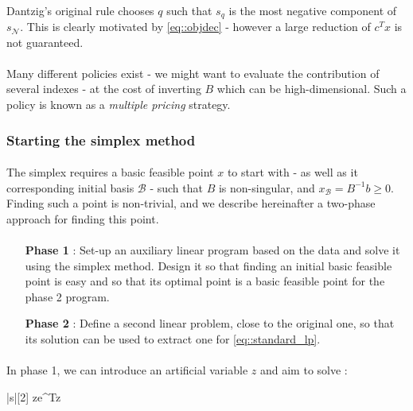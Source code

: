\documentclass[a4paper]{article}
\newcommand\reflp{\eqref{eq::standard_lp}}
\begin{document}
{{{				
				\paragraph{} Dantzig's original rule chooses $q$ such that $s_q$ is the most negative component of $s_\mathcal{N}$. This is clearly motivated by \eqref{eq::objdec} - however a large reduction of $c^Tx$ is not guaranteed. 
				
				\paragraph{} Many different policies exist - we might want to evaluate the contribution of  several indexes - at the cost of inverting $B$ which can be high-dimensional. Such a policy is known as a \emph{multiple pricing} strategy. 
			}
			\subsubsection{Starting the simplex method}
			{
				\paragraph{} The simplex requires a basic feasible point $x$ to start with - as well as it corresponding initial basis $\mathcal{B}$ - such that $B$ is non-singular, and $x_\mathcal{B} = B^{-1}b\geq 0$. Finding such a point is non-trivial, and we describe hereinafter a two-phase approach for finding this point. 
				
				\paragraph{} 
				\sffamily
				{
				\begin{itemize}
					\item[\textbf{Phase 1}] : Set-up an auxiliary linear program based on the data and solve it using the simplex method. Design it so that finding an initial basic feasible point is easy and so that its optimal point is a basic feasible point for the phase 2 program. 
					\item[\textbf{Phase 2}] : Define a second linear problem, close to the original one, so that its solution can be used to extract one for \reflp. 
				\end{itemize}	
				
				\rmfamily
				\paragraph{} In phase 1, we can introduce an artificial variable $z$ and aim to solve : 
				\begin{mini}|s|[2]
					{z}{e^Tz}
					{\label{eq::firstphase}}{}
				\end{mini}
				
}}}}
\end{document}
